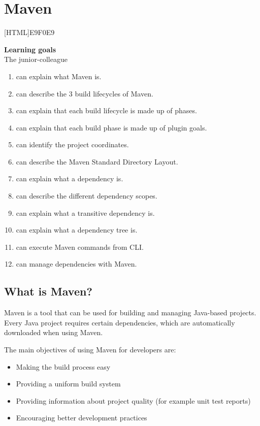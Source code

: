 \chapter{Maven}
\label{chap:maven}

[HTML]{E9F0E9}{\parbox{\textwidth}{%
\noindent \textbf{Learning goals}\\
The junior-colleague
\begin{enumerate}[nolistsep]
\item can explain what Maven is.
\item can describe the 3 build lifecycles of Maven.
\item can explain that each build lifecycle is made up of phases.
\item can explain that each build phase is made up of plugin goals.
\item can identify the project coordinates.
\item can describe the Maven Standard Directory Layout.
\item can explain what a dependency is.
\item can describe the different dependency scopes.
\item can explain what a transitive dependency is.
\item can explain what a dependency tree is.
\item can execute Maven commands from CLI.
\item can manage dependencies with Maven.
\end{enumerate}}}

\section{What is Maven?}

Maven is a tool that can be used for building and managing Java-based projects.
Every Java project requires certain dependencies, which are automatically downloaded when using Maven.

The main objectives of using Maven for developers are:
\begin{itemize}
\item Making the build process easy
\item Providing a uniform build system
\item Providing information about project quality (for example unit test reports)
\item Encouraging better development practices
\end{itemize}


